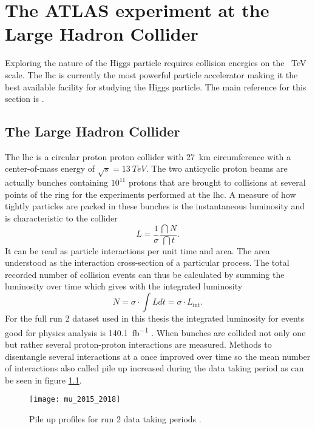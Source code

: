\chapter{The ATLAS experiment at the Large Hadron Collider}\label{sec:atlas}
Exploring the nature of the Higgs particle requires collision energies on the \qty[]{}{TeV} scale. The \ac{lhc} is currently the most powerful particle accelerator making it the best available facility for studying the Higgs particle. The main reference for this section is \citep{aad2008atlas}.

\section{The Large Hadron Collider}
The \ac{lhc} is a circular proton proton collider with \qty[]{27}{km} circumference with a center-of-mass energy of $\sqrt{s}=\qty[]{13}{TeV}$. The two anticyclic proton beams are actually bunches containing $10^{11}$ protons that are brought to collisions at several points of the ring for the experiments performed at the \ac{lhc}. A measure of how tightly particles are packed in these bunches is the instantaneous luminosity and is characteristic to the collider
\begin{equation}
    L=\frac{1}{\sigma}\frac{\dint{N}}{\dint{t}}.
\end{equation}
It can be read as particle interactions per unit time and area. The area understood as the interaction cross-section of a particular process. The total recorded number of collision events can thus be calculated by summing the luminosity over time which gives with the integrated luminosity
\begin{equation}
    N=\sigma\cdot\int L dt=\sigma\cdot L_\mathrm{int}.
\end{equation}
For the full run 2 dataset used in this thesis the integrated luminosity for events good for physics analysis is \qty[]{140.1}{fb^{-1}} \citep{DAPR-2021-01}. When bunches are collided not only one but rather several proton-proton interactions are measured. Methods to disentangle several  interactions at a once improved over time so the mean number of interactions also called pile up increased during the data taking period as can be seen in figure \ref{fig:pileup}.
\begin{figure}
    \centering
    \texttt{[image: mu\_2015\_2018]}
    \caption[]{Pile up profiles for run 2 data taking periods \citep{pileup}.}
    \label{fig:pileup}
\end{figure}

